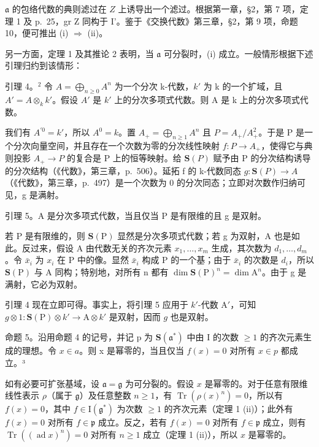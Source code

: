 \(\mathfrak{a}\) 的包络代数的典则滤过在 \(Z\) 上诱导出一个滤过。根据第一章，§2，第 7 项，定理 1 及 p.~25，gr Z 同构于 I'。鉴于《交换代数》第三章，§2，第 9 项，命题 10，便可推出 (i) \(\Longrightarrow\) (ii)。

另一方面，定理 1 及其推论 2 表明，当 \(\mathfrak{a}\) 可分裂时，(i) 成立。一般情形根据下述引理归约到该情形：

引理 4。\(^{2}\) 令 \(A = \bigoplus_{n \geq 0} A^{n}\) 为一个分次 k-代数，\(k'\) 为 k 的一个扩域，且 \(A' = A \otimes_{k} k'\)。假设 \(A'\) 是 \(k'\) 上的分次多项式代数。则 A 是 k 上的分次多项式代数。

我们有 \(A^{\prime0}=k'\)，所以 \(A^{0}=k\)。置 \(A_{+}=\bigoplus_{n\geq1}A^{n}\) 且 \(P=A_{+}/A_{+}^{2}\)。于是 P 是一个分次向量空间，并且存在一个次数为零的分次线性映射 \(f:P\to A_{+}\)，使得它与典则投影 \(A_{+} \rightarrow P\) 的复合是 P 上的恒等映射。给 \(\mathbf{S}(P)\) 赋予由 P 的分次结构诱导的分次结构（《代数》，第三章，p.~506）。延拓 f 的 k-代数同态 \(g : \mathbf{S}(P) \rightarrow A\)（《代数》，第三章，p.~497）是一个次数为 0 的分次同态；立即对次数作归纳可见，g 是满射。

引理 5。A 是分次多项式代数，当且仅当 P 是有限维的且 g 是双射。

若 P 是有限维的，则 \(\mathbf{S}(\mathrm{P})\) 显然是分次多项式代数；若 g 为双射，A 也是如此。反过来，假设 A 由代数无关的齐次元素 \(x_{1},\ldots,x_{m}\) 生成，其次数为 \(d_{1},\ldots,d_{m}\)。令 \(\bar{x}_{i}\) 为 \(x_{i}\) 在 P 中的像。显然 \(\bar{x}_{i}\) 构成 P 的一个基；由于 \(\bar{x}_{i}\) 的次数是 \(d_{i}\)，所以 \(\mathbf{S}(\mathrm{P})\) 与 A 同构；特别地，对所有 n 都有 \(\dim\mathbf{S}(\mathrm{P})^{n}=\dim\mathrm{A}^{n}\)。由于 g 是满射，它必为双射。

引理 4 现在立即可得。事实上，将引理 5 应用于 \(k'\)-代数 \(\mathrm{A}'\)，可知 \(g \otimes 1: \mathbf{S}(\mathrm{P}) \otimes k' \to \mathrm{A} \otimes k'\) 是双射，因而 \(g\) 也是双射。

命题 5。沿用命题 4 的记号，并记 p 为 \(\mathbf{S}(\mathfrak{a}^{*})\) 中由 I 的次数 \(\geq 1\) 的齐次元素生成的理想。令 \(x \in a\)。则 x 是幂零的，当且仅当 \(f(x) = 0\) 对所有 \(x \in p\) 都成立。³

如有必要可扩张基域，设 \(\mathfrak{a} = \mathfrak{g}\) 为可分裂的。假设 \(x\) 是幂零的。对于任意有限维线性表示 \(\rho\)（属于 \(\mathfrak{g}\)）及任意整数 \(n \geq 1\)，有 \(\operatorname{Tr}(\rho(x)^n) = 0\)，所以有 \(f(x) = 0\)，其中 \(f \in \mathrm{I}(\mathfrak{g}^*)\) 为次数 \(\geq 1\) 的齐次元素（定理 1 (ii)）；此外有 \(f(x) = 0\) 对所有 \(f \in \mathfrak{p}\) 成立。反之，若有 \(f(x) = 0\) 对所有 \(f \in \mathfrak{p}\) 成立，则有 \(\operatorname{Tr}((\operatorname{ad} x)^n) = 0\) 对所有 \(n \geq 1\) 成立（定理 1 (ii)），所以 \(x\) 是幂零的。

